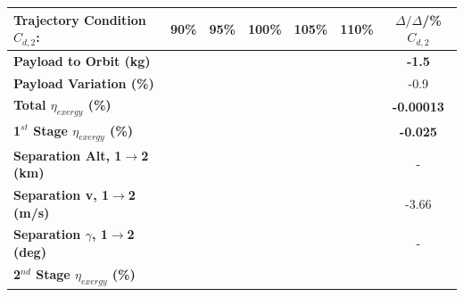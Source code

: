 \begin{table}[ht]
	\centering
	\begin{tabular}{l c c c c c c} 
		\hline \textbf{Trajectory Condition}   \qquad  $C_{d,2}$:
		&90\%
		&95\%
		&100\%
		&105\%
		&110\%
		& $\Delta/\Delta$/\%$C_{d,2}$
		\\
		\hline \textbf{Payload to Orbit (kg)}
		& \textbf{\PayloadToOrbitCdNinety}
		& \textbf{\PayloadToOrbitCdNinetyFive}
		& \textbf{\PayloadToOrbitCdStandard}
		& \textbf{\PayloadToOrbitCdOneHundredFive}
		& \textbf{\PayloadToOrbitCdOneHundredTen}
		&\textbf{-1.5}
		\\
		\textbf{Payload Variation (\%)}
		& \PayloadVarCdNinety
		& \PayloadVarCdNinetyFive
		& \PayloadVarCdStandard
		& \PayloadVarCdOneHundredFive
		& \PayloadVarCdOneHundredTen
		&-0.9
		\\
		\textbf{Total $\eta_{exergy}$ (\%)}
		& \textbf{\totalExergyEffCdNinety}
		& \textbf{\totalExergyEffCdNinetyFive}
		& \textbf{\totalExergyEffCdStandard}
		& \textbf{\totalExergyEffCdOneHundredFive}
		& \textbf{\totalExergyEffCdOneHundredTen}
		& \textbf{-0.00013}
		\\
		\hline 
		\textbf{1$^{st}$ Stage $\eta_{exergy}$ (\%)}
		& \textbf{\firstExergyEffCdNinety}
		& \textbf{\firstExergyEffCdNinetyFive}
		& \textbf{\firstExergyEffCdStandard}
		& \textbf{\firstExergyEffCdOneHundredFive}
		& \textbf{\firstExergyEffCdOneHundredTen}
		& \textbf{-0.025}
		\\
		\textbf{Separation Alt, 1$\rightarrow$2 (km)}
		& \firstsecondSeparationAltCdNinety
		& \firstsecondSeparationAltCdNinetyFive
		& \firstsecondSeparationAltCdStandard
		& \firstsecondSeparationAltCdOneHundredFive
		& \firstsecondSeparationAltCdOneHundredTen
		& -
		\\
		\textbf{Separation v, 1$\rightarrow$2 (m/s)}
		& \firstsecondSeparationvCdNinety
		& \firstsecondSeparationvCdNinetyFive
		& \firstsecondSeparationvCdStandard
		& \firstsecondSeparationvCdOneHundredFive
		& \firstsecondSeparationvCdOneHundredTen
		&-3.66
		\\
		\textbf{Separation $\gamma$, 1$\rightarrow$2 (deg)}
		& \firstsecondSeparationgammaCdNinety
		& \firstsecondSeparationgammaCdNinetyFive
		& \firstsecondSeparationgammaCdStandard
		& \firstsecondSeparationgammaCdOneHundredFive
		& \firstsecondSeparationgammaCdOneHundredTen
		& -
		\\
		\hline 
		\textbf{2$^{nd}$ Stage $\eta_{exergy}$ (\%)}
		& \textbf{\secondExergyEffCdNinety}
		& \textbf{\secondExergyEffCdNinetyFive}
		& \textbf{\secondExergyEffCdStandard}

\end{tabular}
\end{table}
